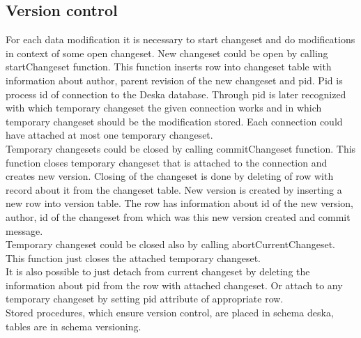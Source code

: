 \documentclass[deska]{subfiles}
\begin{document}
\subsection{Version control}
For each data modification it is necessary to start changeset and do modifications in context of some open changeset. New changeset could be open by calling startChangeset function. This function inserts row into changeset table with information about author, parent revision of the new changeset and pid. Pid is process id of connection to the Deska database. Through pid is later recognized with which temporary changeset the given connection works and in which temporary changeset should be the modification stored. Each connection could have attached at most one temporary changeset.\\
Temporary changesets could be closed by calling commitChangeset function. This function closes temporary changeset that is attached to the connection and creates new version. Closing of the changeset is done by deleting of row with record about it from the changeset table. New version is created by inserting a new row into version table. The row has information about id of the new version, author, id of the changeset from which was this new version created and commit message.\\
Temporary changeset could be closed also by calling abortCurrentChangeset. This function just closes the attached temporary changeset.\\
It is also possible to just detach from current changeset by deleting the information about pid from the row with attached changeset. Or attach to any temporary changeset by setting pid attribute of appropriate row.\\
Stored procedures, which ensure version control, are placed in schema deska, tables are in schema versioning.
\end{document}
